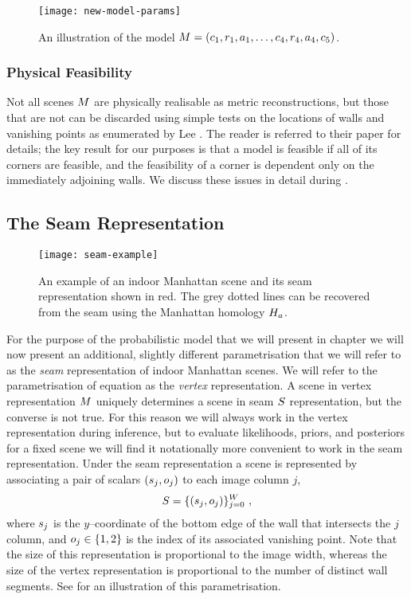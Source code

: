 \begin{figure}[tb]
  \centering
  \texttt{[image: new-model-params]}
  \caption{An illustration of the model
    $\Scene=(c_1,r_1,a_1,\ldots,c_4,r_4,a_4,c_5)$.}
  \label{fig:scene-params}
\end{figure}

\subsubsection{Physical Feasibility}

Not all scenes $\Scene$ are physically realisable
as metric reconstructions, but those that are not can be discarded
using simple tests on the locations of walls and vanishing points as
enumerated by Lee \etal \cite{Lee09}. The reader is referred to their
paper for details; the key result for our purposes is that a model is
feasible if all of its corners are feasible, and the feasibility of a
corner is dependent only on the immediately adjoining walls. We
discuss these issues in detail during .

\subsection{The Seam Representation}
\label{sec:seam-representation}

\begin{figure}[tb]%
  \centering
  \texttt{[image: seam-example]}
  \caption{An example of an indoor Manhattan scene and its seam
    representation shown in red. The grey dotted lines can be
    recovered from the seam using the Manhattan homology $\Hcf$.}
  \label{fig:seam-example}
\end{figure}

For the purpose of the probabilistic model that we will present in
chapter  we will now present an additional, slightly
different parametrisation that we will refer to as the \textit{seam}
representation of indoor Manhattan scenes. We will refer to the
parametrisation of equation  as the
\textit{vertex} representation. A scene in vertex representation
$\Scene$ uniquely determines a scene in seam $\Seam$ representation,
but the converse is not true. For this reason we will always work in
the vertex representation during inference, but to evaluate
likelihoods, priors, and posteriors for a fixed scene we will find it
notationally more convenient to work in the seam representation. Under
the seam representation a scene is represented by associating a pair of
scalars $(\seam_j,\WallOrient_j)$ to each image column $j$,
\begin{equation}
  \label{eq:seam-def}
  \Seam = \{(\seam_j,\WallOrient_j)\}_{j=0}^\Width  ~,
\end{equation}
where $\seam_j$ is the $y$--coordinate of the bottom edge of the wall
that intersects the $j$\th column, and $\WallOrient_j\in\{1,2\}$ is
the index of its associated vanishing point. Note that the size of
this representation is proportional to the image width, whereas the
size of the vertex representation is proportional to the number of
distinct wall segments. See 
for an illustration of this parametrisation.

